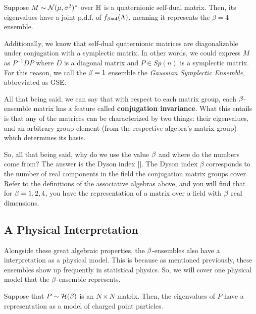 \bigskip

 Suppose $M \sim \mathcal{N}(\mu,\sigma^2)^*$ over $\mathbb{H}$ is a quaternionic self-dual matrix.
Then, its eigenvalues have a joint p.d.f. of $f_{\beta = 4}(\Lambda)$, meaning it represents the $\beta = 4$ ensemble.

Additionally, we know that self-dual quaternionic matrices are diagonalizable under conjugation with a symplectic matrix.
In other words, we could express $M$ as $P^{-1} D P$ where $D$ is a diagonal matrix and $P \in Sp(n)$ is a symplectic matrix.
For this reason, we call the $\beta = 1$ ensemble the \textit{Gaussian Symplectic Ensemble}, abbreviated as GSE.

\bigskip

All that being said, we can say that with respect to each matrix group, each $\beta$-ensemble matrix has a feature called
\textbf{conjugation invariance}. What this entails is that any of the matrices can be characterized by two things: their eigenvalues, and an arbitrary group element (from the respective algebra's matrix group) which determines its basis.

\newpage

So, all that being said, why do we use the value $\beta$ and where do the numbers come from? The answer is the Dyson index [\cite{tao}].
The Dyson index $\beta$ corresponds to the number of real components in the field the conjugation matrix groups cover. Refer to the definitions
of the associative algebras above, and you will find that for $\beta = 1,2,4$, you have the representation of a matrix over a field with $\beta$ real dimensions.


\newpage
\subsection{A Physical Interpretation}

Alongside these great algebraic properties, the $\beta$-ensembles also have a interpretation as a physical model.
This is because as mentioned previously, these ensembles show up frequently in statistical physics.
So, we will cover one physical model that the $\beta$-ensemble represents.

Suppose that $P \sim \mathcal{H}(\beta)$ is an $N \times N$ matrix. Then, the eigenvalues of $P$ have a representation as a model of charged point particles.


